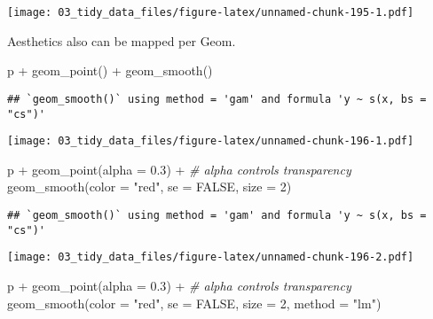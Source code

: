 \documentclass[
]{book}
\newenvironment{Shaded}{\begin{snugshade}}{\end{snugshade}}
\newcommand{\AttributeTok}[1]{\textcolor[rgb]{0.77,0.63,0.00}{#1}}
\newcommand{\CommentTok}[1]{\textcolor[rgb]{0.56,0.35,0.01}{\textit{#1}}}
\newcommand{\ConstantTok}[1]{\textcolor[rgb]{0.00,0.00,0.00}{#1}}
\newcommand{\DecValTok}[1]{\textcolor[rgb]{0.00,0.00,0.81}{#1}}
\newcommand{\FloatTok}[1]{\textcolor[rgb]{0.00,0.00,0.81}{#1}}
\newcommand{\FunctionTok}[1]{\textcolor[rgb]{0.00,0.00,0.00}{#1}}
\newcommand{\NormalTok}[1]{#1}
\newcommand{\SpecialCharTok}[1]{\textcolor[rgb]{0.00,0.00,0.00}{#1}}
\newcommand{\StringTok}[1]{\textcolor[rgb]{0.31,0.60,0.02}{#1}}
\begin{document}
\texttt{[image: 03\_tidy\_data\_files/figure-latex/unnamed-chunk-195-1.pdf]}

Aesthetics also can be mapped per Geom.

\begin{Shaded}
\begin{Highlighting}[]
\NormalTok{p }\SpecialCharTok{+} \FunctionTok{geom\_point}\NormalTok{() }\SpecialCharTok{+}
  \FunctionTok{geom\_smooth}\NormalTok{()}
\end{Highlighting}
\end{Shaded}

\begin{verbatim}
## `geom_smooth()` using method = 'gam' and formula 'y ~ s(x, bs = "cs")'
\end{verbatim}

\texttt{[image: 03\_tidy\_data\_files/figure-latex/unnamed-chunk-196-1.pdf]}

\begin{Shaded}
\begin{Highlighting}[]
\NormalTok{p }\SpecialCharTok{+} \FunctionTok{geom\_point}\NormalTok{(}\AttributeTok{alpha =} \FloatTok{0.3}\NormalTok{) }\SpecialCharTok{+} \CommentTok{\# alpha controls transparency}
  \FunctionTok{geom\_smooth}\NormalTok{(}\AttributeTok{color =} \StringTok{"red"}\NormalTok{, }\AttributeTok{se =} \ConstantTok{FALSE}\NormalTok{, }\AttributeTok{size =} \DecValTok{2}\NormalTok{)}
\end{Highlighting}
\end{Shaded}

\begin{verbatim}
## `geom_smooth()` using method = 'gam' and formula 'y ~ s(x, bs = "cs")'
\end{verbatim}

\texttt{[image: 03\_tidy\_data\_files/figure-latex/unnamed-chunk-196-2.pdf]}

\begin{Shaded}
\begin{Highlighting}[]
\NormalTok{p }\SpecialCharTok{+} \FunctionTok{geom\_point}\NormalTok{(}\AttributeTok{alpha =} \FloatTok{0.3}\NormalTok{) }\SpecialCharTok{+} \CommentTok{\# alpha controls transparency}
  \FunctionTok{geom\_smooth}\NormalTok{(}\AttributeTok{color =} \StringTok{"red"}\NormalTok{, }\AttributeTok{se =} \ConstantTok{FALSE}\NormalTok{, }\AttributeTok{size =} \DecValTok{2}\NormalTok{, }\AttributeTok{method =} \StringTok{"lm"}\NormalTok{)}
\end{Highlighting}
\end{Shaded}
\end{document}
